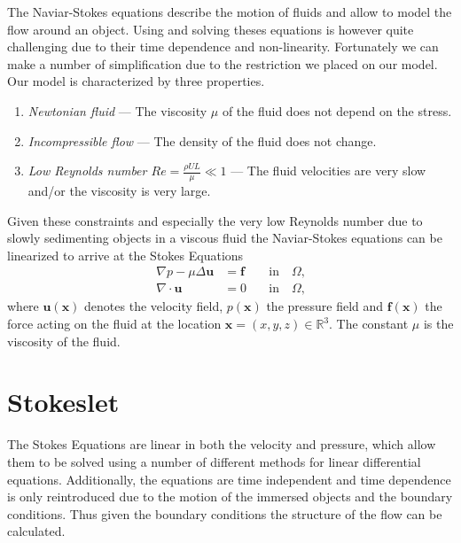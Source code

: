 \documentclass[a4paper,11pt]{kth-mag}
\begin{document}
The Naviar-Stokes equations describe the motion of fluids and allow to model the flow around an object. Using and solving theses equations is however quite challenging due to their time dependence and non-linearity. Fortunately we can make a number of simplification due to the restriction we placed on our model. Our model is characterized by three properties.

\begin{enumerate}
  \item{\textit{Newtonian fluid} — The viscosity $\mu$ of the fluid does not depend on the stress.}
  \item{\textit{Incompressible flow} — The density of the fluid does not change.}
  \item{\textit{Low Reynolds number $Re = \frac{\rho U L}{\mu} \ll 1$} — The fluid velocities are very slow and/or the viscosity is very large.}
\end{enumerate}

Given these constraints and especially the very low Reynolds number due to slowly sedimenting objects in a viscous fluid the Naviar-Stokes equations can be linearized to arrive at the Stokes Equations
\begin{equation}
\label{eq:stokes_equations}
\begin{aligned}
    \nabla p - \mu \Delta \mathbf{u} &= \mathbf{f} \quad &\text{in} \quad \Omega \text{,}\\
    \nabla \cdot \mathbf{u} &= 0 \quad &\text{in} \quad \Omega \text{,}
\end{aligned}
\end{equation}
where $\mathbf{u}(\mathbf{x})$ denotes the velocity field, $p(\mathbf{x})$ the pressure field and $\mathbf{f}(\mathbf{x})$ the force acting on the fluid at the location $\mathbf{x} = (x,y,z) \in \mathbb{R}^3$. The constant $\mu$ is the viscosity of the fluid.

\section{Stokeslet}

The Stokes Equations are linear in both the velocity and pressure, which allow them to be solved using a number of different methods for linear differential equations. Additionally, the equations are time independent and time dependence is only reintroduced due to the motion of the immersed objects and the boundary conditions. Thus given the boundary conditions the structure of the flow can be calculated.
\end{document}

